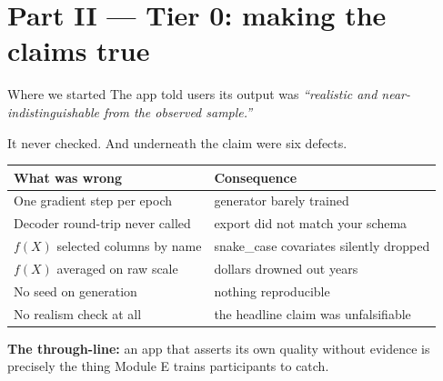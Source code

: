\documentclass[aspectratio=169]{beamer}
\begin{document}
\section{Part II --- Tier 0: making the claims true}

\begin{frame}{Where we started}
  \small
  The app told users its output was
  \textit{``realistic and near-indistinguishable from the observed sample.''}

  \vspace{0.6em}
  It never checked. And underneath the claim were six defects.

  \vspace{0.5em}
  \begin{center}
  \small
  \begin{tabular}{@{}ll@{}}
    \toprule
    \textbf{What was wrong} & \textbf{Consequence} \\
    \midrule
    One gradient step per epoch      & generator barely trained \\
    Decoder round-trip never called  & export did not match your schema \\
    $f(X)$ selected columns by name  & snake\_case covariates silently dropped \\
    $f(X)$ averaged on raw scale     & dollars drowned out years \\
    No seed on generation            & nothing reproducible \\
    No realism check at all          & the headline claim was unfalsifiable \\
    \bottomrule
  \end{tabular}
  \end{center}

  \vspace{0.5em}
  \textcolor{accent}{\textbf{The through-line:}} an app that asserts its own quality
  without evidence is precisely the thing Module E trains participants to catch.
\end{frame}
\end{document}
